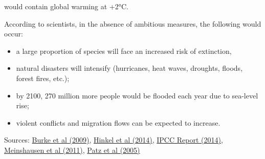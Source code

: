 \documentclass[12pt]{article} %
\begin{document}
\begin{appendices}
\begin{itemize}
would contain global warming at +2°C. 
\end{itemize}
According to scientists, in the absence of ambitious measures, the following would occur: 
\begin{itemize}
\item a large proportion of species will face an increased risk of extinction,
\item natural disasters will intensify (hurricanes, heat waves, droughts,
floods, forest fires, etc.); 
\item by 2100, 270 million more people would be flooded each year due to
sea-level rise; 
\item violent conflicts and migration flows can be expected to increase. 
\end{itemize}
Sources: \href{http://www.pnas.org/content/106/49/20670}{Burke et al (2009)},
\href{http://www.pnas.org/content/pnas/early/2014/01/29/1222469111.full.pdf}{Hinkel et al (2014)},
\href{http://www.ipcc.ch/report/ar5/syr/}{IPCC Report (2014)}, \href{https://link.springer.com/article/10.1007/s10584-011-0156-z}{Meinshausen et al (2011)},
\href{https://www.nature.com/articles/nature04188}{Patz et al (2005)}


\end{appendices}
\end{document}

